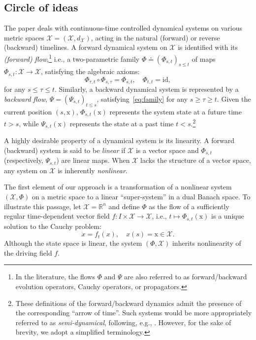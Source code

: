 \documentclass[sn-mathphys-num]{sn-jnl}
\numberwithin{equation}{section}
\theoremstyle{mythm}
\theoremstyle{mydef}
\newcommand{\id}{\mathrm{id}}
\begin{document}
\subsection{Circle of ideas}

The paper deals with continuous-time controlled dynamical systems on various metric spaces \( \mathcal{X} = (\mathcal{X}, d_{\mathcal X}) \), acting in the natural (forward) or reverse (backward) timelines. A forward dynamical system on \( \mathcal{X} \) is identified with its \emph{(forward) flow},\footnote{
In the literature, the flows $\Phi$ and $\Psi$ are also referred to as forward/backward evolution operators, Cauchy operators, or propagators. 
} i.e., a two-parametric family \( \Phi \doteq (\Phi_{s,t})_{s \leq t} \) of maps \( \Phi_{s,t} \colon \mathcal{X} \to \mathcal{X} \), satisfying the algebraic axioms:
\begin{equation}
  \label{eq:family}
  \Phi_{\tau,t} \circ \Phi_{s,\tau} = \Phi_{s,t}, \quad \Phi_{t,t} = \id,
\end{equation}
for any \( s \leq \tau \leq t \).
Similarly, a backward dynamical system is represented by a \emph{backward flow}, \( \Psi = (\Psi_{s,t})_{t\leq s} \), satisfying~\eqref{eq:family} for any \( s \geq \tau \geq t \). Given the current position \( (s, \mathrm{x}) \), \( \Phi_{s,t}(\mathrm{x}) \) represents the system state at a future time \( t > s \), while \( \Psi_{s,t}(\mathrm{x}) \) represents the state at a past time \( t < s \).\footnote{These definitions of the forward/backward dynamics admit the presence of the corresponding ``arrow of time''. Such systems would be more appropriately referred to as \emph{semi-dynamical}, following, e.g., \cite{saperstone1981semidynamical}. However, for the sake of brevity, we adopt a simplified terminology.} 


A highly desirable property of a dynamical system is its linearity. A forward (backward) system is said to be \emph{linear} if \( \mathcal{X} \) is a vector space and \( \Phi_{s,t} \) (respectively, \( \Psi_{s,t} \)) are linear maps. When \( \mathcal{X} \) lacks the structure of a vector space, any system on \( \mathcal{X} \) is inherently \emph{nonlinear}. 


The first element of our approach is a transformation of a nonlinear system \( (\mathcal X, \Phi) \) on a metric space to a linear ``super-system'' in a dual Banach space.
To illustrate this passage, let \( \mathcal{X} = \mathbb{R}^n \) and define \( \Phi \) as the flow of a sufficiently regular time-dependent vector field \( f \colon I \times \mathcal X \to \mathcal X \), i.e., \( t \mapsto \Phi_{s,t}(\mathrm{x}) \) is a unique solution to the Cauchy problem:
\begin{equation}\label{iode}
    \dot{x} = f_t(x), \quad x(s) = \mathrm{x} \in \mathcal X.
\end{equation}
Although the state space is linear, the system $(\Phi, \mathcal X)$ inherits nonlinearity of the driving field $f$. 
\end{document}
